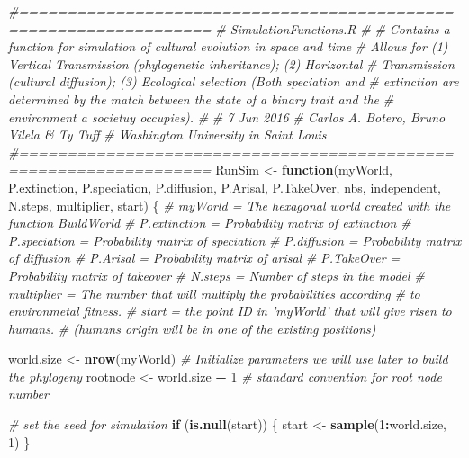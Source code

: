 \documentclass[]{book}
\newenvironment{Shaded}{\begin{snugshade}}{\end{snugshade}}
\newcommand{\KeywordTok}[1]{\textcolor[rgb]{0.13,0.29,0.53}{\textbf{{#1}}}}
\newcommand{\DecValTok}[1]{\textcolor[rgb]{0.00,0.00,0.81}{{#1}}}
\newcommand{\StringTok}[1]{\textcolor[rgb]{0.31,0.60,0.02}{{#1}}}
\newcommand{\CommentTok}[1]{\textcolor[rgb]{0.56,0.35,0.01}{\textit{{#1}}}}
\newcommand{\ControlFlowTok}[1]{\textcolor[rgb]{0.13,0.29,0.53}{\textbf{{#1}}}}
\newcommand{\OperatorTok}[1]{\textcolor[rgb]{0.81,0.36,0.00}{\textbf{{#1}}}}
\newcommand{\NormalTok}[1]{{#1}}
\theoremstyle{definition}
\theoremstyle{definition}
\theoremstyle{definition}
\theoremstyle{remark}
\begin{document}
\begin{Shaded}
\begin{Highlighting}[]
\CommentTok{#==================================================================}
\CommentTok{# SimulationFunctions.R}
\CommentTok{#}
\CommentTok{# Contains a function for simulation of cultural evolution in space and time}
\CommentTok{# Allows for (1) Vertical Transmission (phylogenetic inheritance); (2) Horizontal}
\CommentTok{# Transmission (cultural diffusion); (3) Ecological selection (Both speciation and}
\CommentTok{# extinction are determined by the match between the state of a binary trait and the}
\CommentTok{# environment a societuy occupies).}
\CommentTok{#}
\CommentTok{# 7 Jun 2016}
\CommentTok{# Carlos A. Botero, Bruno Vilela & Ty Tuff}
\CommentTok{# Washington University in Saint Louis}
\CommentTok{#==================================================================}
\NormalTok{RunSim <-}\StringTok{ }\ControlFlowTok{function}\NormalTok{(myWorld, P.extinction, P.speciation,}
\NormalTok{                   P.diffusion, P.Arisal, P.TakeOver, nbs, independent,}
\NormalTok{                   N.steps, multiplier, start) \{}
  \CommentTok{# myWorld = The hexagonal world created with the function BuildWorld}
  \CommentTok{# P.extinction = Probability matrix of extinction}
  \CommentTok{# P.speciation = Probability matrix of speciation}
  \CommentTok{# P.diffusion = Probability matrix of diffusion}
  \CommentTok{# P.Arisal = Probability matrix of arisal}
  \CommentTok{# P.TakeOver = Probability matrix of takeover}
  \CommentTok{# N.steps = Number of steps in the model}
  \CommentTok{# multiplier = The number that will multiply the probabilities according}
  \CommentTok{# to environmetal fitness.}
  \CommentTok{# start = the point ID in 'myWorld' that will give risen to humans.}
  \CommentTok{# (humans origin will be in one of the existing positions)}

\NormalTok{  world.size <-}\StringTok{ }\KeywordTok{nrow}\NormalTok{(myWorld)}
  \CommentTok{# Initialize parameters we will use later to build the phylogeny}
\NormalTok{  rootnode <-}\StringTok{  }\NormalTok{world.size }\OperatorTok{+}\StringTok{ }\DecValTok{1} \CommentTok{# standard convention for root node number}

  \CommentTok{# set the seed for simulation}
  \ControlFlowTok{if}\NormalTok{ (}\KeywordTok{is.null}\NormalTok{(start)) \{}
\NormalTok{  start <-}\StringTok{ }\KeywordTok{sample}\NormalTok{(}\DecValTok{1}\OperatorTok{:}\NormalTok{world.size, }\DecValTok{1}\NormalTok{)}
\NormalTok{  \}}


\end{Highlighting}
\end{Shaded}
\end{document}
